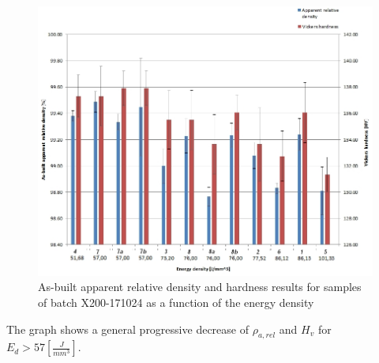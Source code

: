 \begin{figure}[ht]
\centering
\centerline{\includegraphics[scale=0.62]{Images/HD-171024}}
\decoRule
\caption[As-built apparent relative density and hardness results for samples of batch X200-171024 as a function of the energy density]{As-built apparent relative density and hardness results for samples of batch X200-171024 as a function of the energy density}
\label{fig:HD-171024}
\end{figure} 

 The graph shows a general progressive decrease of  $\rho_{a,rel}$ and $H_v$ for $E_d>57 [\frac{J}{mm^3}]$.

 \begin{center}
\begin{table}[ht]
\noindent{}

\caption[Standard deviations and average values for apparent relative densities and hardnesses of types "7" and "8" specimens of batch X200-171024]{Standard deviations and average values for apparent relative densities and hardnesses of types "7" and "8" specimens of batch X200-171024}
\label{tab:78}
\end{table}
 \end{center}


